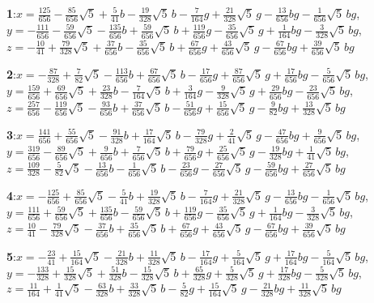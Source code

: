 \documentclass[10pt]{article}
\begin{document}
{\footnotesize\raggedright
\noindent\textbf{1}:\quad $x=\tfrac{125}{656}-\tfrac{85}{656}\sqrt5+\tfrac{5}{41}b-\tfrac{19}{328}\sqrt5\,b-\tfrac{7}{164}g+\tfrac{21}{328}\sqrt5\,g-\tfrac{13}{656}bg-\tfrac{1}{656}\sqrt5\,bg$,\quad $y=-\tfrac{111}{656}-\tfrac{59}{656}\sqrt5-\tfrac{135}{656}b+\tfrac{59}{656}\sqrt5\,b+\tfrac{119}{656}g-\tfrac{35}{656}\sqrt5\,g+\tfrac{1}{164}bg-\tfrac{3}{328}\sqrt5\,bg$,\quad $z=-\tfrac{10}{41}+\tfrac{79}{328}\sqrt5+\tfrac{37}{656}b-\tfrac{35}{656}\sqrt5\,b+\tfrac{67}{656}g+\tfrac{43}{656}\sqrt5\,g-\tfrac{67}{656}bg+\tfrac{39}{656}\sqrt5\,bg$\par\smallskip
\noindent\textbf{2}:\quad $x=-\tfrac{87}{328}+\tfrac{7}{82}\sqrt5-\tfrac{113}{656}b+\tfrac{67}{656}\sqrt5\,b-\tfrac{17}{656}g+\tfrac{87}{656}\sqrt5\,g+\tfrac{17}{656}bg-\tfrac{5}{656}\sqrt5\,bg$,\quad $y=\tfrac{159}{656}+\tfrac{69}{656}\sqrt5+\tfrac{23}{328}b-\tfrac{7}{164}\sqrt5\,b+\tfrac{3}{164}g-\tfrac{9}{328}\sqrt5\,g+\tfrac{29}{656}bg-\tfrac{23}{656}\sqrt5\,bg$,\quad $z=\tfrac{257}{656}-\tfrac{119}{656}\sqrt5-\tfrac{93}{656}b+\tfrac{37}{656}\sqrt5\,b-\tfrac{51}{656}g+\tfrac{15}{656}\sqrt5\,g-\tfrac{9}{82}bg+\tfrac{13}{328}\sqrt5\,bg$\par\smallskip
\noindent\textbf{3}:\quad $x=\tfrac{141}{656}+\tfrac{55}{656}\sqrt5-\tfrac{91}{328}b+\tfrac{17}{164}\sqrt5\,b-\tfrac{79}{328}g+\tfrac{2}{41}\sqrt5\,g-\tfrac{47}{656}bg+\tfrac{9}{656}\sqrt5\,bg$,\quad $y=\tfrac{319}{656}-\tfrac{89}{656}\sqrt5+\tfrac{9}{656}b+\tfrac{7}{656}\sqrt5\,b+\tfrac{79}{656}g+\tfrac{25}{656}\sqrt5\,g-\tfrac{19}{328}bg+\tfrac{1}{41}\sqrt5\,bg$,\quad $z=\tfrac{109}{328}-\tfrac{5}{82}\sqrt5-\tfrac{13}{656}b-\tfrac{1}{656}\sqrt5\,b-\tfrac{23}{656}g-\tfrac{27}{656}\sqrt5\,g-\tfrac{59}{656}bg+\tfrac{27}{656}\sqrt5\,bg$\par\smallskip
\noindent\textbf{4}:\quad $x=-\tfrac{125}{656}+\tfrac{85}{656}\sqrt5-\tfrac{5}{41}b+\tfrac{19}{328}\sqrt5\,b-\tfrac{7}{164}g+\tfrac{21}{328}\sqrt5\,g-\tfrac{13}{656}bg-\tfrac{1}{656}\sqrt5\,bg$,\quad $y=\tfrac{111}{656}+\tfrac{59}{656}\sqrt5+\tfrac{135}{656}b-\tfrac{59}{656}\sqrt5\,b+\tfrac{119}{656}g-\tfrac{35}{656}\sqrt5\,g+\tfrac{1}{164}bg-\tfrac{3}{328}\sqrt5\,bg$,\quad $z=\tfrac{10}{41}-\tfrac{79}{328}\sqrt5-\tfrac{37}{656}b+\tfrac{35}{656}\sqrt5\,b+\tfrac{67}{656}g+\tfrac{43}{656}\sqrt5\,g-\tfrac{67}{656}bg+\tfrac{39}{656}\sqrt5\,bg$\par\smallskip
\noindent\textbf{5}:\quad $x=-\tfrac{23}{41}+\tfrac{15}{164}\sqrt5-\tfrac{21}{328}b+\tfrac{11}{328}\sqrt5\,b-\tfrac{17}{164}g+\tfrac{5}{164}\sqrt5\,g+\tfrac{17}{164}bg-\tfrac{5}{164}\sqrt5\,bg$,\quad $y=-\tfrac{133}{328}+\tfrac{15}{328}\sqrt5+\tfrac{51}{328}b-\tfrac{15}{328}\sqrt5\,b+\tfrac{65}{328}g+\tfrac{5}{328}\sqrt5\,g+\tfrac{17}{328}bg-\tfrac{5}{328}\sqrt5\,bg$,\quad $z=\tfrac{11}{164}+\tfrac{1}{41}\sqrt5-\tfrac{63}{328}b+\tfrac{33}{328}\sqrt5\,b-\tfrac{5}{82}g+\tfrac{15}{164}\sqrt5\,g-\tfrac{21}{328}bg+\tfrac{11}{328}\sqrt5\,bg$\par\smallskip
}
\end{document}
